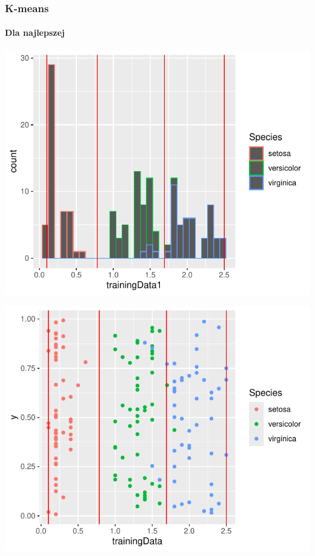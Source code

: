 \documentclass[
  12pt,
]{article}
\begin{document}
\subsubsection{K-means}\label{k-means}

\paragraph{Dla najlepszej}\label{dla-najlepszej-2}

\begin{center}\includegraphics{Sprawozdanie2_files/figure-latex/kMeans_najl-1} \end{center}

\begin{center}\includegraphics{Sprawozdanie2_files/figure-latex/kMeans_najl-2} \end{center}
\end{document}
